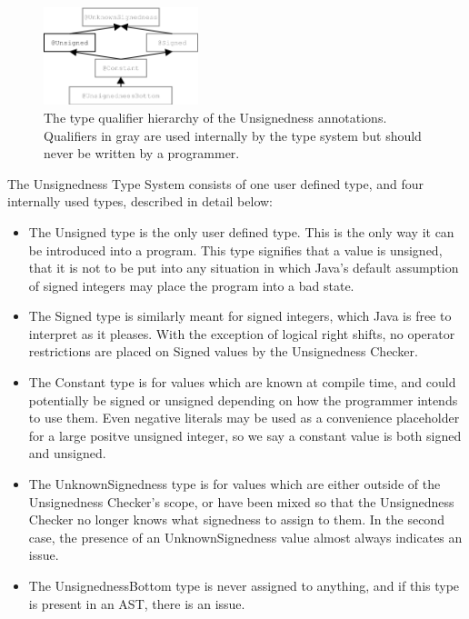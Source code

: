 \documentclass{sig-alternate-05-2015}
\begin{document}
\begin{figure}
    \centering
    \includegraphics[width=0.4\textwidth]{unsignedness}
    \caption{The type qualifier hierarchy of the Unsignedness annotations.
Qualifiers in gray are used internally by the type system but should never be written by a programmer.}
    \label{fig:my_label}
\end{figure}

The Unsignedness Type System consists of one user defined type, and four internally used types, described in detail below:

\begin{itemize}
  \item The Unsigned type is the only user defined type. This is the only way it can be introduced into a program. This type signifies that a value is unsigned, that it is not to be put into any situation in which Java's default assumption of signed integers may place the program into a bad state.
  \item The Signed type is similarly meant for signed integers, which Java is free to interpret as it pleases. With the exception of logical right shifts, no operator restrictions are placed on Signed values by the Unsignedness Checker.
  \item The Constant type is for values which are known at compile time, and could potentially be signed or unsigned depending on how the programmer intends to use them. Even negative literals may be used as a convenience placeholder for a large positve unsigned integer, so we say a constant value is both signed and unsigned.
  \item The UnknownSignedness type is for values which are either outside of the Unsignedness Checker's scope, or have been mixed so that the Unsignedness Checker no longer knows what signedness to assign to them. In the second case, the presence of an UnknownSignedness value almost always indicates an issue.
  \item The UnsignednessBottom type is never assigned to anything, and if this type is present in an AST, there is an issue.
\end{itemize}
\end{document}
